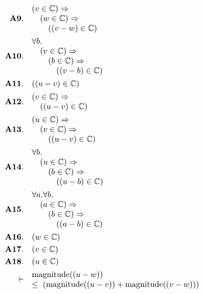 \documentclass[11pt]{article}
\theoremstyle{plain}
\begin{document}
\begin{align*}
  \mathbf{A9.}\quad & \begin{array}{@{}l@{}} (v \in \mathbb{C}) \Rightarrow  \\ \quad (w \in \mathbb{C}) \Rightarrow  \\ \quad \quad ((v - w) \in \mathbb{C}) \end{array} \\
  \mathbf{A10.}\quad & \begin{array}{@{}l@{}} \forall b. \\ \quad (v \in \mathbb{C}) \Rightarrow  \\ \quad \quad (b \in \mathbb{C}) \Rightarrow  \\ \quad \quad \quad ((v - b) \in \mathbb{C}) \end{array} \\
  \mathbf{A11.}\quad & ((u - v) \in \mathbb{C}) \\
  \mathbf{A12.}\quad & \begin{array}{@{}l@{}} (v \in \mathbb{C}) \Rightarrow  \\ \quad ((u - v) \in \mathbb{C}) \end{array} \\
  \mathbf{A13.}\quad & \begin{array}{@{}l@{}} (u \in \mathbb{C}) \Rightarrow  \\ \quad (v \in \mathbb{C}) \Rightarrow  \\ \quad \quad ((u - v) \in \mathbb{C}) \end{array} \\
  \mathbf{A14.}\quad & \begin{array}{@{}l@{}} \forall b. \\ \quad (u \in \mathbb{C}) \Rightarrow  \\ \quad \quad (b \in \mathbb{C}) \Rightarrow  \\ \quad \quad \quad ((u - b) \in \mathbb{C}) \end{array} \\
  \mathbf{A15.}\quad & \begin{array}{@{}l@{}} \forall a. \forall b. \\ \quad (a \in \mathbb{C}) \Rightarrow  \\ \quad \quad (b \in \mathbb{C}) \Rightarrow  \\ \quad \quad \quad ((a - b) \in \mathbb{C}) \end{array} \\
  \mathbf{A16.}\quad & (w \in \mathbb{C}) \\
  \mathbf{A17.}\quad & (v \in \mathbb{C}) \\
  \mathbf{A18.}\quad & (u \in \mathbb{C}) \\
  \vdash\quad & \begin{array}{@{}l@{}} \operatorname{magnitude}((u - w)) \\ \leq\; (\operatorname{magnitude}((u - v)) + \operatorname{magnitude}((v - w))) \end{array}
\end{align*}
\end{document}
